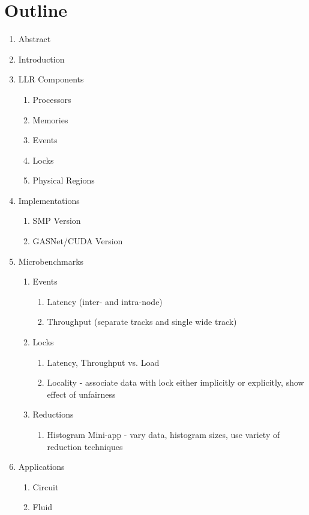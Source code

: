 \section{Outline}

\begin{enumerate}
\item Abstract
\item Introduction
\item LLR Components
  \begin{enumerate}
  \item Processors
  \item Memories
  \item Events
  \item Locks
  \item Physical Regions
  \end{enumerate}
\item Implementations
  \begin{enumerate}
  \item SMP Version
  \item GASNet/CUDA Version
  \end{enumerate}
\item Microbenchmarks
  \begin{enumerate}
  \item Events
    \begin{enumerate}
    \item Latency (inter- and intra-node)
    \item Throughput (separate tracks and single wide track)
    \end{enumerate}
  \item Locks
    \begin{enumerate}
    \item Latency, Throughput vs. Load
    \item Locality - associate data with lock either implicitly or explicitly, show effect of unfairness
    \end{enumerate}
  \item Reductions
    \begin{enumerate}
    \item Histogram Mini-app - vary data, histogram sizes, use variety of reduction techniques
    \end{enumerate}
  \end{enumerate}
\item Applications
  \begin{enumerate}
  \item Circuit
  \item Fluid

\end{enumerate}
\end{enumerate}
